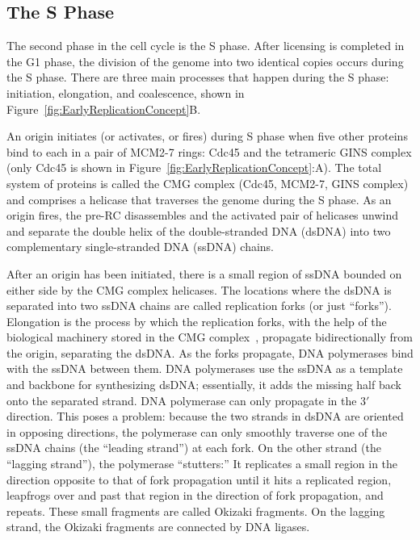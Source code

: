 		
		\subsection{The S Phase}
		\label{subsec:SPhase}
		
		The second phase in the cell cycle is the S phase.
		After licensing is completed in the G1 phase, the division of the genome into two identical copies occurs during the S phase.
		There are three main processes that happen during the S phase: initiation, elongation, and coalescence, shown in Figure~\ref{fig:EarlyReplicationConcept}B.
		
		An origin initiates (or activates, or fires) during S phase when five other proteins bind to each in a pair of MCM2-7 rings:
		Cdc45 and the tetrameric GINS complex (only Cdc45 is shown in Figure~\ref{fig:EarlyReplicationConcept}:A).
		The total system of proteins is called the CMG complex (Cdc45, MCM2-7, GINS complex) and comprises a helicase that traverses the genome during the S phase.
		As an origin fires, the pre-RC disassembles and the activated pair of helicases unwind and separate the double helix of the double-stranded DNA (dsDNA) into two complementary single-stranded DNA (ssDNA) chains.~\cite{GINSComplex}
		
		After an origin has been initiated, there is a small region of ssDNA bounded on either side by the CMG complex helicases.
		The locations where the dsDNA is separated into two ssDNA chains are called replication forks (or just ``forks'').
		Elongation is the process by which the replication forks, with the help of the biological machinery stored in the CMG complex~\cite{PurifiedProteins}, propagate bidirectionally from the origin, separating the dsDNA.
		As the forks propagate, DNA polymerases bind with the ssDNA between them.
		DNA polymerases use the ssDNA as a template and backbone for synthesizing dsDNA; essentially, it adds the missing half back onto the separated strand.
		DNA polymerase can only propagate in the $3'$ direction.
		This poses a problem: because the two strands in dsDNA are oriented in opposing directions, the polymerase can only smoothly traverse one of the ssDNA chains (the ``leading strand'') at each fork.
		On the other strand (the ``lagging strand''), the polymerase ``stutters:''
		It replicates a small region in the direction opposite to that of fork propagation until it hits a replicated region, leapfrogs over and past that region in the direction of fork propagation, and repeats.
		These small fragments are called Okizaki fragments.
		On the lagging strand, the Okizaki fragments are connected by DNA ligases.~\cite{MolecularCellBiology, CellMolApproach, OriginsReview}
		
